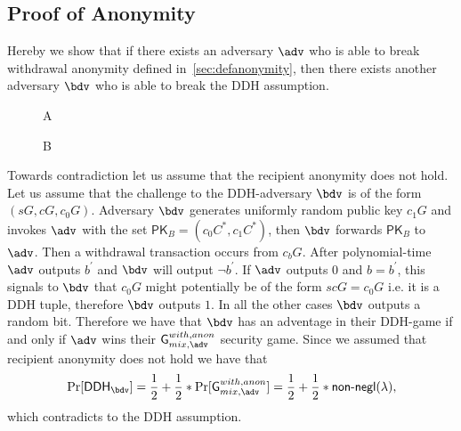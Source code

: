 \documentclass[a4paper]{article}
\theoremstyle{definition}
\begin{document}
\begin{appendices}

\section{Proof of Anonymity} \label{appendanon}
Hereby we show that if there exists an adversary $\adv$ who is able to break withdrawal anonymity defined in~\ref{sec:defanonymity}, then there exists another adversary $\bdv$ who is able to break the DDH assumption.

\begin{figure}
	\centering
\begin{bbrenv}{A}
 \begin{bbrbox} [name=\bdv]

 \begin{bbrenv}{B}
 \begin{bbrbox}[name=\adv]
 \end{bbrbox}
 
 \end{bbrenv}
 
 \end{bbrbox}
 
\end{bbrenv}

\end{figure}

Towards contradiction let us assume that the recipient anonymity does not hold. Let us assume that the challenge to the DDH-adversary $\bdv$ is of the form $(sG,cG,c_{0}G)$. Adversary $\bdv$ generates uniformly random public key $c_{1}G$ and invokes $\adv$ with the set $\textsf{PK}_{B}=(c_{0}C^{*}, c_{1}C^{*})$, then $\bdv$ forwards $\textsf{PK}_{B}$ to $\adv$. Then a withdrawal transaction occurs from $c_{b}G$. After polynomial-time $\adv$ outputs $b^{'}$ and $\bdv$ will output $\lnot b^{'}$. If $\adv$ outputs $0$ and $b=b^{'}$, this signals to $\bdv$ that $c_{0}G$ might potentially be of the form $scG=c_{0}G$  i.e. it is a DDH tuple, therefore $\bdv$ outputs $1$. In all the other cases $\bdv$ outputs a random bit. Therefore we have that $\bdv$ has an adventage in their DDH-game if and only if $\adv$ wins their $\textsf{G}^{with, anon}_{mix, \adv}$ security game. Since we assumed that recipient anonymity does not hold we have that $$\Pr[\textsf{DDH}_{\bdv}]=\frac{1}{2}+\frac{1}{2}*\Pr[\textsf{G}^{with, anon}_{mix, \adv}]=\frac{1}{2}+\frac{1}{2}*\textsf{non-negl}(\lambda),$$ which contradicts to the DDH assumption.


\end{appendices}
\end{document}
